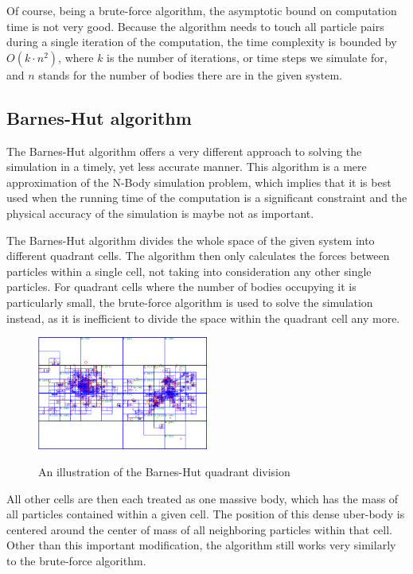 \documentclass[journal]{IEEEtran}
\begin{document}
				Of course, being a brute-force algorithm, the asymptotic bound on computation time is not very good. Because the algorithm needs to touch all particle pairs during a single iteration of the computation, the time complexity is bounded by $O(k \cdot n^2)$, where $k$ is the number of iterations, or time steps we simulate for, and $n$ stands for the number of bodies there are in the given system.
		
		\subsection*{Barnes-Hut algorithm}
		\label{barnes}
			
			The Barnes-Hut algorithm offers a very different approach to solving the simulation in a timely, yet less accurate manner. This algorithm is a mere approximation of the N-Body simulation problem, which implies that it is best used when the running time of the computation is a significant constraint and the physical accuracy of the simulation is maybe not as important.
		
			The Barnes-Hut algorithm divides the whole space of the given system into different quadrant cells. The algorithm then only calculates the forces between particles within a single cell, not taking into consideration any other single particles. For quadrant cells where the number of bodies occupying it is particularly small, the brute-force algorithm is used to solve the simulation instead, as it is inefficient to divide the space within the quadrant cell any more.
	
			\begin{figure}[ht]
				\centering
				\includegraphics[width=0.5\textwidth]{barneshut.png}
				\caption{\label{cells}An illustration of the Barnes-Hut quadrant division}
				\cite{barnespic}
			\end{figure}
	
			All other cells are then each treated as one massive body, which has the mass of all particles contained within a given cell. The position of this dense uber-body is centered around the center of mass of all neighboring particles within that cell. Other than this important modification, the algorithm still works very similarly to the brute-force algorithm. 
			
\end{document}
